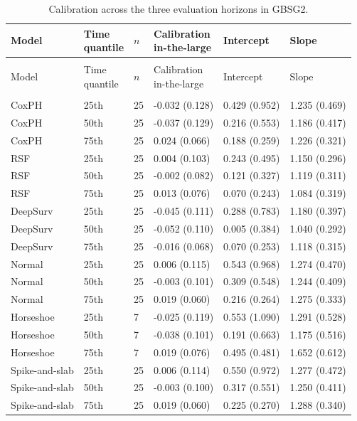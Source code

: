 \clearpage\begingroup\singlespacing\footnotesize
\setlength{\LTpre}{6pt}\setlength{\LTpost}{6pt}
\begin{longtable}{@{}>{\raggedright\arraybackslash}p{3.1cm}>{\raggedright\arraybackslash}p{1.3cm}p{0.5cm}p{2.9cm}p{2.9cm}p{2.9cm}@{}}
\caption{Calibration across the three evaluation horizons in GBSG2.}\label{tab:calibration-all-gbsg2}\\
\toprule Model & \shortstack[l]{Time\\quantile} & $n$ & \shortstack[l]{Calibration\\in-the-large} & Intercept & Slope \\\midrule\endfirsthead
\multicolumn{6}{l}{\tablename\ \thetable\ (continued)}\\
\toprule Model & \shortstack[l]{Time\\quantile} & $n$ & \shortstack[l]{Calibration\\in-the-large} & Intercept & Slope \\\midrule\endhead
\midrule\multicolumn{6}{r}{Continued on next page}\\\endfoot
\bottomrule\endlastfoot
CoxPH & 25th & 25 & -0.032 (0.128) & 0.429 (0.952) & 1.235 (0.469) \\
CoxPH & 50th & 25 & -0.037 (0.129) & 0.216 (0.553) & 1.186 (0.417) \\
CoxPH & 75th & 25 & 0.024 (0.066) & 0.188 (0.259) & 1.226 (0.321) \\
RSF & 25th & 25 & 0.004 (0.103) & 0.243 (0.495) & 1.150 (0.296) \\
RSF & 50th & 25 & -0.002 (0.082) & 0.121 (0.327) & 1.119 (0.311) \\
RSF & 75th & 25 & 0.013 (0.076) & 0.070 (0.243) & 1.084 (0.319) \\
DeepSurv & 25th & 25 & -0.045 (0.111) & 0.288 (0.783) & 1.180 (0.397) \\
DeepSurv & 50th & 25 & -0.052 (0.110) & 0.005 (0.384) & 1.040 (0.292) \\
DeepSurv & 75th & 25 & -0.016 (0.068) & 0.070 (0.253) & 1.118 (0.315) \\
Normal & 25th & 25 & 0.006 (0.115) & 0.543 (0.968) & 1.274 (0.470) \\
Normal & 50th & 25 & -0.003 (0.101) & 0.309 (0.548) & 1.244 (0.409) \\
Normal & 75th & 25 & 0.019 (0.060) & 0.216 (0.264) & 1.275 (0.333) \\
Horseshoe & 25th & 7 & -0.025 (0.119) & 0.553 (1.090) & 1.291 (0.528) \\
Horseshoe & 50th & 7 & -0.038 (0.101) & 0.191 (0.663) & 1.175 (0.516) \\
Horseshoe & 75th & 7 & 0.019 (0.076) & 0.495 (0.481) & 1.652 (0.612) \\
Spike-and-slab & 25th & 25 & 0.006 (0.114) & 0.550 (0.972) & 1.277 (0.472) \\
Spike-and-slab & 50th & 25 & -0.003 (0.100) & 0.317 (0.551) & 1.250 (0.411) \\
Spike-and-slab & 75th & 25 & 0.019 (0.060) & 0.225 (0.270) & 1.288 (0.340) \\
\end{longtable}

